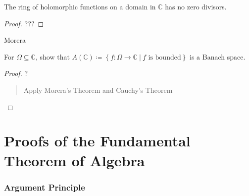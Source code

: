 
\begin{corollary}

The ring of holomorphic functions on a domain in \({\mathbb{C}}\) has no
zero divisors.

\end{corollary}

\begin{proof}

???

\end{proof}


Morera

\begin{proposition}

For \(\Omega\subseteq{\mathbb{C}}\), show that
\(A({\mathbb{C}})\coloneqq\left\{{f: \Omega \to {\mathbb{C}}{~\mathrel{\Big|}~}f\text{ is bounded}}\right\}\)
is a Banach space.

\end{proposition}

\begin{proof}

?

\begin{quote}
Apply Morera's Theorem and Cauchy's Theorem
\end{quote}

\end{proof}

\hypertarget{proofs-of-the-fundamental-theorem-of-algebra}{%
\section{Proofs of the Fundamental Theorem of
Algebra}\label{proofs-of-the-fundamental-theorem-of-algebra}}

\hypertarget{argument-principle-1}{%
\subsubsection{Argument Principle}\label{argument-principle-1}}


